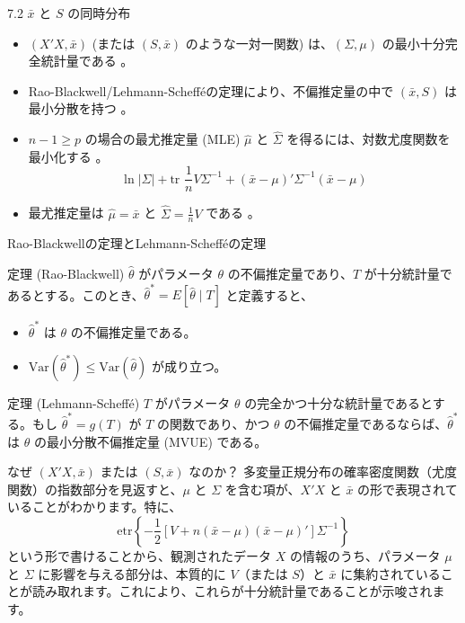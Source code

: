 \documentclass[aspectratio=169]{beamer}
\begin{document}
\begin{frame}{7.2 $\bar{x}$ と $S$ の同時分布}
\begin{itemize}
    \item $(X'X, \bar{x})$ (または $(S, \bar{x})$ のような一対一関数) は、$(\Sigma, \mu)$ の最小十分完全統計量である 。
    \item Rao-Blackwell/Lehmann-Scheff\'eの定理により、不偏推定量の中で $(\bar{x}, S)$ は最小分散を持つ 。
    \item $n-1 \ge p$ の場合の最尤推定量 (MLE) $\hat{\mu}$ と $\hat{\Sigma}$ を得るには、対数尤度関数を最小化する 。
    \begin{equation*}
    \ln |\Sigma| + \text{tr }\frac{1}{n}V\Sigma^{-1} + (\bar{x} - \mu)'\Sigma^{-1}(\bar{x} - \mu) \tag{7.2}
    \end{equation*}
    \item 最尤推定量は $\hat{\mu} = \bar{x}$ と $\hat{\Sigma} = \frac{1}{n}V$ である 。
\end{itemize}
\end{frame}

\begin{frame}{Rao-Blackwellの定理とLehmann-Schefféの定理}
\begin{block}{定理 (Rao-Blackwell)}
$\hat{\theta}$ がパラメータ $\theta$ の不偏推定量であり、$T$ が十分統計量であるとする。このとき、$\hat{\theta}^* = E[\hat{\theta} \mid T]$ と定義すると、
\begin{itemize}
    \item $\hat{\theta}^*$ は $\theta$ の不偏推定量である。
    \item $\mathrm{Var}(\hat{\theta}^*) \leq \mathrm{Var}(\hat{\theta})$ が成り立つ。
\end{itemize}
\end{block}
\begin{block}{定理 (Lehmann-Scheffé)}
$T$ がパラメータ $\theta$ の完全かつ十分な統計量であるとする。もし $\hat{\theta}^* = g(T)$ が $T$ の関数であり、かつ $\theta$ の不偏推定量であるならば、$\hat{\theta}^*$ は $\theta$ の最小分散不偏推定量 (MVUE) である。
\end{block}
\end{frame}

\begin{frame}{なぜ $(X'X, \bar{x})$ または $(S, \bar{x})$ なのか？}
多変量正規分布の確率密度関数（尤度関数）の指数部分を見返すと、$\mu$ と $\Sigma$ を含む項が、$X'X$ と $\bar{x}$ の形で表現されていることがわかります。特に、
\[
\mathrm{etr}\left\{-\frac{1}{2}\left[V + n(\bar{x} - \mu)(\bar{x} - \mu)'\right]\Sigma^{-1}\right\}
\]
という形で書けることから、観測されたデータ $X$ の情報のうち、パラメータ $\mu$ と $\Sigma$ に影響を与える部分は、本質的に $V$（または $S$）と $\bar{x}$ に集約されていることが読み取れます。これにより、これらが十分統計量であることが示唆されます。
\end{frame}
\end{document}
